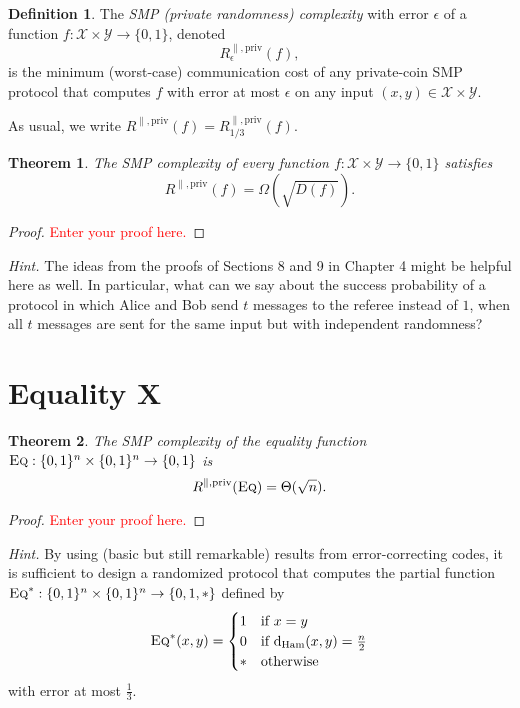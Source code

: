 \documentclass[11pt]{amsart}
\theoremstyle{plain}
\newtheorem{theorem}{Theorem}
\theoremstyle{definition}
\newtheorem{definition}{Definition}
\theoremstyle{plain}
\newcommand{\calX}{\mathcal{X}}
\newcommand{\calY}{\mathcal{Y}}
\newcommand{\dHam}{\mathrm{d}_{\mathrm{Ham}}}
\newcommand{\Eq}{\textsc{Eq}}
\newcommand{\replacethistext}[1]{\textcolor{red}{#1}}
\begin{document}
\begin{definition}
The \emph{SMP (private randomness) complexity} with error $\epsilon$ of a function $f : \calX \times \calY \to \{0,1\}$, denoted
\[
R^{\parallel,\mathrm{priv}}_\epsilon(f),
\] 
is the minimum (worst-case) communication cost of any private-coin SMP protocol that computes $f$ with error at most $\epsilon$ on any input $(x,y) \in \calX \times \calY$.
\end{definition}

As usual, we write $R^{\parallel,\mathrm{priv}}(f) = R^{\parallel,\mathrm{priv}}_{1/3}(f)$.

\begin{theorem}
The SMP complexity of every function $f : \calX \times \calY \to \{0,1\}$ satisfies
\[
R^{\parallel,\mathrm{priv}}(f) = \Omega(\sqrt{D(f)}).
\]
\end{theorem}

\begin{proof}
\replacethistext{Enter your proof here.}
\end{proof}


\bigskip
\noindent \emph{Hint.} The ideas from the proofs of Sections 8 and 9 in Chapter 4 might be helpful here as well. In particular, what can we say about the success probability of a protocol in which Alice and Bob send $t$ messages to the referee instead of $1$, when all $t$ messages are sent for the same input but with independent randomness?


\newpage 
\section{Equality X}

\begin{theorem}
The SMP complexity of the equality function $\Eq : \{0,1\}^n \times \{0,1\}^n \to \{0,1\}$ is
\[
R^{\parallel,\mathrm{priv}}(\Eq) = \Theta(\sqrt{n}).
\]
\end{theorem}

\begin{proof}
\replacethistext{Enter your proof here.}
\end{proof}

\bigskip
\noindent \emph{Hint.} By using (basic but still remarkable) results from error-correcting codes, it is sufficient to design a randomized protocol that computes the partial function $\Eq^* : \{0,1\}^n \times \{0,1\}^n \to \{0,1,*\}$ defined by
\[
\Eq^*(x,y) = \begin{cases}
1 & \mbox{if } x = y \\
0 & \mbox{if } \dHam(x,y) = \frac n2 \\
* & \mbox{otherwise}
\end{cases}
\]
with error at most $\frac13$.
\end{document}
